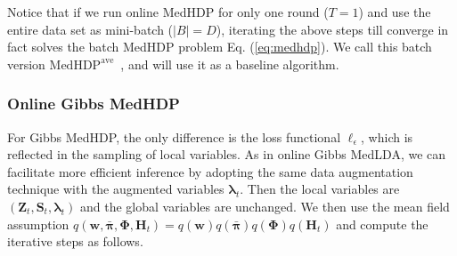 \documentclass[twoside,11pt]{article}
\newcommand{\Zv}{\bm{Z}}
\newcommand{\Sv}{\bm{S}}
\newcommand{\Hv}{\bm{H}}
\newcommand{\wv}{\bm{w}}
\newcommand{\Phiv}{\bm{\Phi}}
\newcommand{\lambdav}{\bm \lambda}
\newcommand{\barpiv}{\bm{\bar{\pi}}}
\newcommand\MedHDPave{$\text{MedHDP}^{\text{ave}}$~}
\begin{document}
Notice that if we run online MedHDP for only one round ($T = 1$) and use the entire data set as mini-batch ($|B| = D$), iterating the above steps till converge in fact solves the batch MedHDP problem Eq. (\ref{eq:medhdp}). We call this batch version \MedHDPave, and will use it as a baseline algorithm.


\subsubsection{Online Gibbs MedHDP}

For Gibbs MedHDP, the only difference is the loss functional $\ell_\epsilon$, which is reflected in the sampling of local variables. As in online Gibbs MedLDA, we can facilitate more efficient inference by adopting the same data augmentation technique with the augmented variables $\lambdav_t$. Then the local variables are $(\Zv_t, \Sv_t, \lambdav_t)$ and the global variables are unchanged. We then use the mean field assumption $q(\wv, \barpiv, \Phiv, \Hv_t) = q(\wv) q(\barpiv) q(\Phiv) q(\Hv_t)$ and compute the iterative steps as follows.
\end{document}

